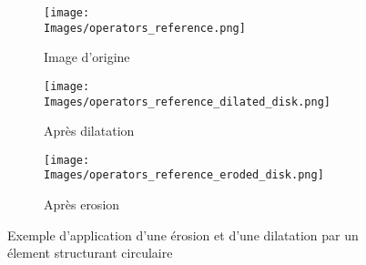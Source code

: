 \documentclass[\main/main.tex]{subfiles}
\providecommand{\Images}{\main/Figures/intro_seg}
\begin{document}
\begin{figure}[h]
    \centering
    \begin{subfigure}[b]{0.30\textwidth}
       \caption{
       Image d'origine
            }
       \centering \texttt{[image: \\Images/operators\_reference.png]}
    \end{subfigure}
    \begin{subfigure}[b]{0.30\textwidth}
       \caption{
            Après dilatation
            }
       \centering \texttt{[image: \\Images/operators\_reference\_dilated\_disk.png]}
    \end{subfigure}
    \begin{subfigure}[b]{0.30\textwidth}
       \caption{
            Après erosion
            }
       \centering \texttt{[image: \\Images/operators\_reference\_eroded\_disk.png]}
    \end{subfigure}
    \caption{
        \label{fig:morpho:operateurs}
        Exemple d'application d'une érosion et d'une dilatation par un élement structurant circulaire
    }
    
\end{figure}
\end{document}
